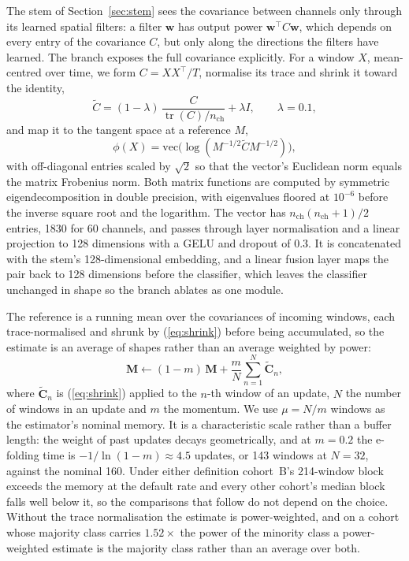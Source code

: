 \documentclass[a4paper,fleqn]{cas-dc}
\begin{document}
The stem of Section~\ref{sec:stem} sees the covariance between channels only through its learned spatial filters: a filter $\mathbf{w}$ has output power $\mathbf{w}^{\top}C\mathbf{w}$, which depends on every entry of the covariance $C$, but only along the directions the filters have learned. The branch exposes the full covariance explicitly. For a window $X$, mean-centred over time, we form $C = XX^{\top}/T$, normalise its trace and shrink it toward the identity,
\begin{equation}
\tilde{C} = (1-\lambda)\,\frac{C}{\operatorname{tr}(C)/n_{\mathrm{ch}}} + \lambda I ,
\qquad \lambda = 0.1 ,
\label{eq:shrink}
\end{equation}
and map it to the tangent space at a reference $M$,
\begin{equation}
\phi(X) = \mathrm{vec}\big(\log(M^{-1/2} \tilde{C} M^{-1/2})\big),
\end{equation}
with off-diagonal entries scaled by $\sqrt{2}$ so that the vector's Euclidean norm equals the matrix Frobenius norm. Both matrix functions are computed by symmetric eigendecomposition in double precision, with eigenvalues floored at $10^{-6}$ before the inverse square root and the logarithm. The vector has $n_{\mathrm{ch}}(n_{\mathrm{ch}}+1)/2$ entries, 1830 for 60 channels, and passes through layer normalisation and a linear projection to 128 dimensions with a GELU and dropout of 0.3. It is concatenated with the stem's 128-dimensional embedding, and a linear fusion layer maps the pair back to 128 dimensions before the classifier, which leaves the classifier unchanged in shape so the branch ablates as one module.

The reference is a running mean over the covariances of incoming windows, each trace-normalised and shrunk by (\ref{eq:shrink}) before being accumulated, so the estimate is an average of shapes rather than an average weighted by power:
\begin{equation}
\mathbf{M} \leftarrow (1-m)\,\mathbf{M} + \frac{m}{N} \sum_{n=1}^{N} \tilde{\mathbf{C}}_n ,
\label{eq:update}
\end{equation}
where $\tilde{\mathbf{C}}_n$ is (\ref{eq:shrink}) applied to the $n$-th window of an update, $N$ the number of windows in an update and $m$ the momentum. We use $\mu = N/m$ windows as the estimator's nominal memory. It is a characteristic scale rather than a buffer length: the weight of past updates decays geometrically, and at $m = 0.2$ the e-folding time is $-1/\ln(1-m) \approx 4.5$ updates, or 143 windows at $N = 32$, against the nominal 160. Under either definition cohort~B's 214-window block exceeds the memory at the default rate and every other cohort's median block falls well below it, so the comparisons that follow do not depend on the choice. Without the trace normalisation the estimate is power-weighted, and on a cohort whose majority class carries $1.52\times$ the power of the minority class a power-weighted estimate is the majority class rather than an average over both.
\end{document}
